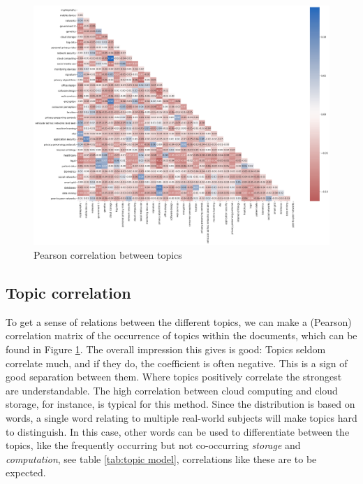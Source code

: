 \documentclass[runningheads]{llncs}
\begin{document}
\begin{figure}
    \includegraphics[width = 1\textwidth]{figures/triangle.png}
    \caption{Pearson correlation between topics}
    \label{fig:triangle}
\end{figure}

\subsection{Topic correlation}
To get a sense of relations between the different topics, we can make a (Pearson) correlation matrix of the occurrence of topics within the documents, which can be found in Figure \ref{fig:triangle}. The overall impression this gives is good: Topics seldom correlate much, and if they do, the coefficient is often negative. This is a sign of good separation between them. Where topics positively correlate the strongest are understandable. The high correlation between cloud computing and cloud storage, for instance, is typical for this method. Since the distribution is based on words, a single word relating to multiple real-world subjects will make topics hard to distinguish. In this case, other words can be used to differentiate between the topics, like the frequently occurring but not co-occurring \textit{storage} and \textit{computation}, see table \ref{tab:topic model}, correlations like these are to be expected.
\end{document}
